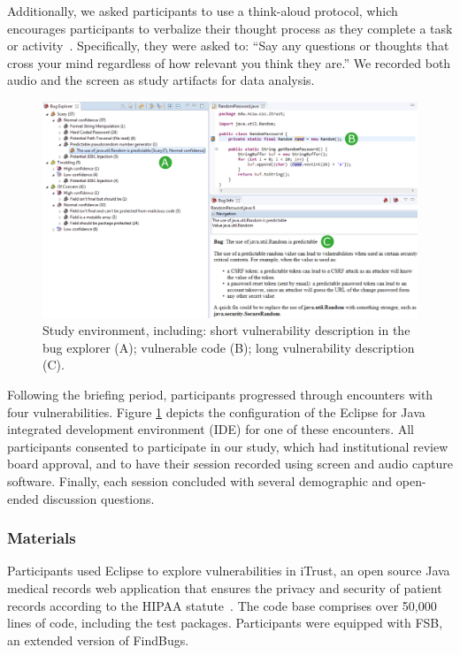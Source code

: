 \documentclass[10pt,journal,compsoc]{IEEEtran}
\begin{document}
Additionally, we asked participants to use a think-aloud protocol, which encourages  participants to verbalize their thought process as they complete a task or activity~\cite{nielsen2002getting}. 
Specifically, they were asked to: ``Say any questions or thoughts that cross your mind regardless of how relevant you think they are.''
We recorded both audio and the screen as study artifacts for data analysis.

\begin{figure}
	\centering
	\includegraphics[width=\textwidth]{Images/StudyEnvironment_Circles}
	\caption{Study environment, including: short vulnerability description in the bug explorer (A); vulnerable code (B); long vulnerability description (C).}
	\label{fig:environment} 
\end{figure}


Following the briefing period, participants progressed through encounters with four vulnerabilities. 
Figure \ref{fig:environment} depicts the configuration of the Eclipse for Java integrated development environment (IDE) for one of these encounters.
All participants consented to participate in our study, which had institutional review board approval, and to have their session recorded using screen and audio capture software.
Finally, each session concluded with several demographic and open-ended discussion questions.



\subsubsection{Materials}
Participants used Eclipse to explore vulnerabilities in iTrust, an open source Java medical records web application that ensures the privacy and security of patient records according to the HIPAA statute~\cite{HIPAA}.
The code base comprises over 50,000 lines of code, including the test packages.
Participants were equipped with FSB, an extended version of FindBugs.
\end{document}

